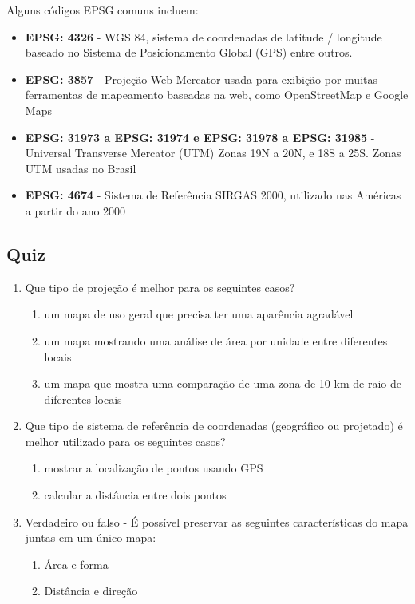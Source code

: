 \documentclass[
  portuguese,
]{krantz}
\providecommand{\tightlist}{%
  \setlength{\itemsep}{0pt}\setlength{\parskip}{0pt}}
\begin{document}
Alguns códigos EPSG comuns incluem:

\begin{itemize}
\tightlist
\item
  \textbf{EPSG: 4326} - WGS 84, sistema de coordenadas de latitude / longitude baseado no Sistema de Posicionamento Global (GPS) entre outros.
\item
  \textbf{EPSG: 3857} - Projeção Web Mercator usada para exibição por muitas ferramentas de mapeamento baseadas na web, como OpenStreetMap e Google Maps
\item
  \textbf{EPSG: 31973 a EPSG: 31974 e EPSG: 31978 a EPSG: 31985} - Universal Transverse Mercator (UTM) Zonas 19N a 20N, e 18S a 25S. Zonas UTM usadas no Brasil
\item
  \textbf{EPSG: 4674} - Sistema de Referência SIRGAS 2000, utilizado nas Américas a partir do ano 2000
\end{itemize}

\hypertarget{quiz}{%
\subsection{Quiz}\label{quiz}}

\begin{enumerate}
\def\labelenumi{\arabic{enumi}.}
\tightlist
\item
  Que tipo de projeção é melhor para os seguintes casos?

  \begin{enumerate}
  \def\labelenumii{\arabic{enumii}.}
  \tightlist
  \item
    um mapa de uso geral que precisa ter uma aparência agradável
  \item
    um mapa mostrando uma análise de área por unidade entre diferentes locais
  \item
    um mapa que mostra uma comparação de uma zona de 10 km de raio de diferentes locais
  \end{enumerate}
\item
  Que tipo de sistema de referência de coordenadas (geográfico ou projetado) é melhor utilizado para os seguintes casos?

  \begin{enumerate}
  \def\labelenumii{\arabic{enumii}.}
  \setcounter{enumii}{3}
  \tightlist
  \item
    mostrar a localização de pontos usando GPS
  \item
    calcular a distância entre dois pontos
  \end{enumerate}
\item
  Verdadeiro ou falso - É possível preservar as seguintes características do mapa juntas em um único mapa:

  \begin{enumerate}
  \def\labelenumii{\arabic{enumii}.}
  \setcounter{enumii}{5}
  \tightlist
  \item
    Área e forma
  \item
    Distância e direção
  \end{enumerate}
\end{enumerate}
\end{document}
